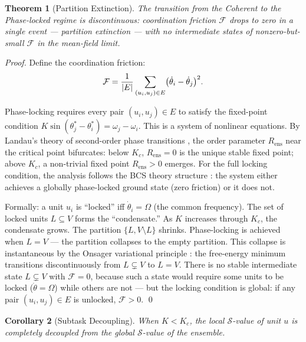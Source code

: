\documentclass[twocolumn,a4paper,11pt]{article}
\theoremstyle{plain}
\newtheorem{theorem}{Theorem}[section]
\newtheorem{corollary}[theorem]{Corollary}
\theoremstyle{definition}
\theoremstyle{remark}
\DeclarePairedDelimiter{\abs}{\lvert}{\rvert}
\begin{document}
\begin{theorem}[Partition Extinction]
\label{thm:partition-extinction}
The transition from the Coherent to the Phase-locked regime is
discontinuous: coordination friction $\mathcal{F}$ drops to zero in a
single event --- partition extinction --- with no intermediate states of
nonzero-but-small $\mathcal{F}$ in the mean-field limit.
\end{theorem}

\begin{proof}
Define the coordination friction:
\[
  \mathcal{F} = \frac{1}{\abs{E}} \sum_{(u_i,u_j) \in E}
  \bigl(\dot{\theta}_i - \dot{\theta}_j\bigr)^2.
\]

Phase-locking requires every pair $(u_i, u_j) \in E$ to satisfy the
fixed-point condition $K \sin(\theta_j^* - \theta_i^*) = \omega_j -
\omega_i$. This is a system of nonlinear equations. By Landau's theory
of second-order phase transitions \cite{landau1937}, the order parameter
$R_\mathrm{ens}$ near the critical point bifurcates: below $K_c$,
$R_\mathrm{ens} = 0$ is the unique stable fixed point; above $K_c$,
a non-trivial fixed point $R_\mathrm{ens} > 0$ emerges. For the
full locking condition, the analysis follows the BCS theory structure
\cite{bardeen1957}: the system either achieves a globally phase-locked
ground state (zero friction) or it does not.

Formally: a unit $u_i$ is ``locked'' iff
$\dot{\theta}_i = \Omega$ (the common frequency). The set of locked
units $L \subseteq V$ forms the ``condensate.'' As $K$ increases through
$K_c$, the condensate grows. The partition $\{L, V \setminus L\}$ shrinks.
Phase-locking is achieved when $L = V$ --- the partition collapses to
the empty partition. This collapse is instantaneous by the Onsager
variational principle \cite{onsager1953}: the free-energy minimum
transitions discontinuously from $L \subsetneq V$ to $L = V$. There
is no stable intermediate state $L \subsetneq V$ with $\mathcal{F} = 0$,
because such a state would require some units to be locked
($\dot{\theta} = \Omega$) while others are not --- but the locking
condition is global: if any pair $(u_i, u_j) \in E$ is unlocked,
$\mathcal{F} > 0$. \qed
\end{proof}

\begin{corollary}[Subtask Decoupling]
\label{cor:subtask-decoupling}
When $K < K_c$, the local $\mathcal{S}$-value of unit $u$ is completely
decoupled from the global $\mathcal{S}$-value of the ensemble.
\end{corollary}
\end{document}
